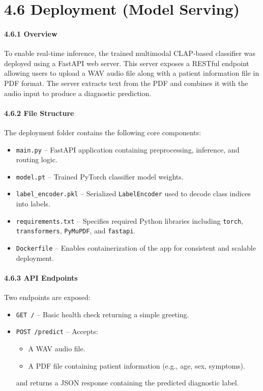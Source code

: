 \section*{4.6 Deployment (Model Serving)}

\paragraph{4.6.1 Overview\\}
To enable real-time inference, the trained multimodal CLAP-based classifier was deployed using a FastAPI web server. This server exposes a RESTful endpoint allowing users to upload a WAV audio file along with a patient information file in PDF format. The server extracts text from the PDF and combines it with the audio input to produce a diagnostic prediction.

\paragraph{4.6.2 File Structure\\}
The deployment folder contains the following core components:

\begin{itemize}
    \item \texttt{main.py} – FastAPI application containing preprocessing, inference, and routing logic.
    \item \texttt{model.pt} – Trained PyTorch classifier model weights.
    \item \texttt{label\_encoder.pkl} – Serialized \texttt{LabelEncoder} used to decode class indices into labels.
    \item \texttt{requirements.txt} – Specifies required Python libraries including \texttt{torch}, \texttt{transformers}, \texttt{PyMuPDF}, and \texttt{fastapi}.
    \item \texttt{Dockerfile} – Enables containerization of the app for consistent and scalable deployment.
\end{itemize}

\paragraph{4.6.3 API Endpoints\\}
Two endpoints are exposed:
\begin{itemize}
    \item \texttt{GET /} – Basic health check returning a simple greeting.
    \item \texttt{POST /predict} – Accepts:
    \begin{itemize}
        \item A WAV audio file.
        \item A PDF file containing patient information (e.g., age, sex, symptoms).
    \end{itemize}
    and returns a JSON response containing the predicted diagnostic label.
\end{itemize}


